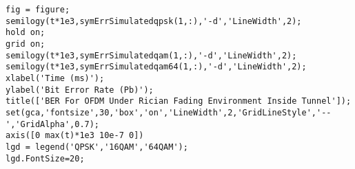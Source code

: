 \begin{lstlisting}[breaklines]
%%
fig = figure;
semilogy(t*1e3,symErrSimulatedqpsk(1,:),'-d','LineWidth',2);
hold on;
grid on;
semilogy(t*1e3,symErrSimulatedqam(1,:),'-d','LineWidth',2);
semilogy(t*1e3,symErrSimulatedqam64(1,:),'-d','LineWidth',2);
xlabel('Time (ms)');
ylabel('Bit Error Rate (Pb)');
title(['BER For OFDM Under Rician Fading Environment Inside Tunnel']);
set(gca,'fontsize',30,'box','on','LineWidth',2,'GridLineStyle','--','GridAlpha',0.7);
axis([0 max(t)*1e3 10e-7 0])
lgd = legend('QPSK','16QAM','64QAM');
lgd.FontSize=20;
\end{lstlisting}

